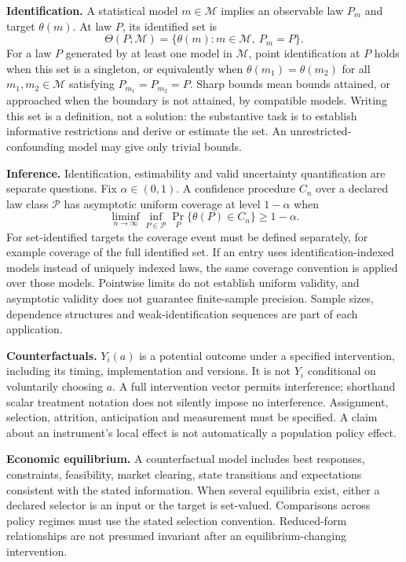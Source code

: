 \documentclass[11pt,a4paper]{article}
\begin{document}
\textbf{Identification.} A statistical model $m\in\mathcal M$ implies an observable law $P_m$ and target $\theta(m)$. At law $P$, its identified set is
\[
\Theta(P;\mathcal M)=\{\theta(m):m\in\mathcal M,\ P_m=P\}.
\]
For a law $P$ generated by at least one model in $\mathcal M$, point identification at $P$ holds when this set is a singleton, or equivalently when $\theta(m_1)=\theta(m_2)$ for all $m_1,m_2\in\mathcal M$ satisfying $P_{m_1}=P_{m_2}=P$. Sharp bounds mean bounds attained, or approached when the boundary is not attained, by compatible models. Writing this set is a definition, not a solution: the substantive task is to establish informative restrictions and derive or estimate the set. An unrestricted-confounding model may give only trivial bounds.

\textbf{Inference.} Identification, estimability and valid uncertainty quantification are separate questions. Fix $\alpha\in(0,1)$. A confidence procedure $C_n$ over a declared law class $\mathcal P$ has asymptotic uniform coverage at level $1-\alpha$ when
\[
\liminf_{n\to\infty}\inf_{P\in\mathcal P}\Pr_P\{\theta(P)\in C_n\}\geq1-\alpha.
\]
For set-identified targets the coverage event must be defined separately, for example coverage of the full identified set. If an entry uses identification-indexed models instead of uniquely indexed laws, the same coverage convention is applied over those models. Pointwise limits do not establish uniform validity, and asymptotic validity does not guarantee finite-sample precision. Sample sizes, dependence structures and weak-identification sequences are part of each application.

\textbf{Counterfactuals.} $Y_i(a)$ is a potential outcome under a specified intervention, including its timing, implementation and versions. It is not $Y_i$ conditional on voluntarily choosing $a$. A full intervention vector permits interference; shorthand scalar treatment notation does not silently impose no interference. Assignment, selection, attrition, anticipation and measurement must be specified. A claim about an instrument's local effect is not automatically a population policy effect.

\textbf{Economic equilibrium.} A counterfactual model includes best responses, constraints, feasibility, market clearing, state transitions and expectations consistent with the stated information. When several equilibria exist, either a declared selector is an input or the target is set-valued. Comparisons across policy regimes must use the stated selection convention. Reduced-form relationships are not presumed invariant after an equilibrium-changing intervention.
\end{document}
